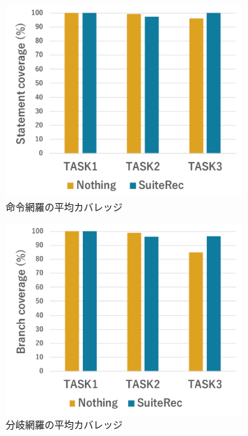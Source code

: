 \documentclass[12pt]{jarticle} %
\begin{document}
\begin{figure}[htbp]
  \begin{center}
   \includegraphics[width=9cm]{C0.pdf}
  \caption{命令網羅の平均カバレッジ}
  \label{C0}
  \end{center}
\end{figure}

\begin{figure}[htbp]
  \begin{center}
   \includegraphics[width=9cm]{C1.pdf}
  \caption{分岐網羅の平均カバレッジ}
  \label{C1}
  \end{center}
\end{figure}
\end{document}
